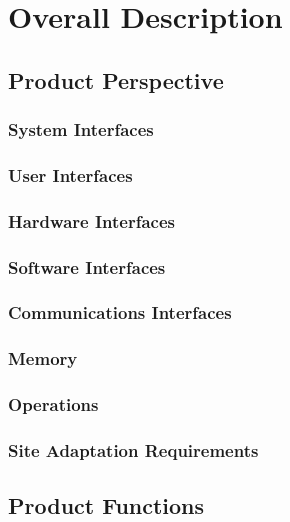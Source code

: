 \documentclass[a4paper,10pt]{article}
\begin{document}
\section{Overall Description}

	\subsection{Product Perspective}
	
		\subsubsection{System Interfaces}

		\subsubsection{User Interfaces}

		\subsubsection{Hardware Interfaces}

		\subsubsection{Software Interfaces}

		\subsubsection{Communications Interfaces}
	
		\subsubsection{Memory}

		\subsubsection{Operations}

		\subsubsection{Site Adaptation Requirements}
		
	\subsection{Product Functions}			
					
\end{document}
